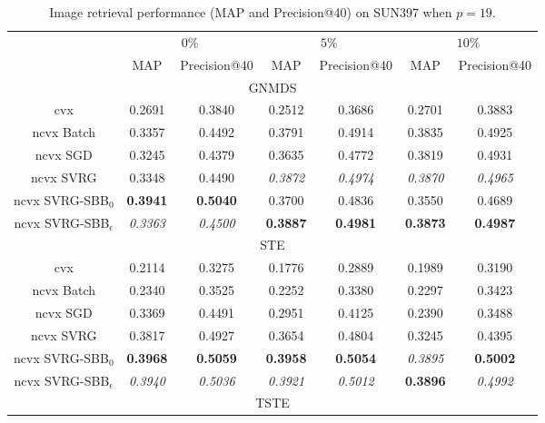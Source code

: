 \documentclass[letterpaper]{article} %
\begin{document}
{
	\begin{table}[tbh]
		\centering
		\caption{Image retrieval performance (MAP and Precision@40) on SUN397 when $p=19$.}
		{
			\begin{tabular}{c||cc||cc||cc}
				\hline
				& \multicolumn{2}{c||}{$0\%$} & \multicolumn{2}{c||}{$5\%$} & \multicolumn{2}{c}{$10\%$}\\
				&  MAP& Precision@40 & MAP 	& Precision@40 & MAP & Precision@40 \\ \hline\hline
				\multicolumn{7}{c}{GNMDS} \\\hline\hline
				cvx              & 0.2691  & 0.3840  & 0.2512  & 0.3686   & 0.2701  & 0.3883  \\ \hline
				ncvx Batch    & 0.3357  & 0.4492  & 0.3791  & 0.4914   & 0.3835  & 0.4925  \\ \hline
				ncvx SGD      & 0.3245  & 0.4379  & 0.3635  & 0.4772   & 0.3819  & 0.4931  \\ \hline
				ncvx SVRG     & 0.3348  & 0.4490  & \textit{0.3872}  & \textit{0.4974}   & \textit{0.3870}  & \textit{0.4965}  \\ \hline
				ncvx SVRG-SBB$_0$  & \textbf{0.3941}  & \textbf{0.5040}  & 0.3700  & 0.4836   & 0.3550  & 0.4689  \\ \hline
				ncvx SVRG-SBB$_\epsilon$ & \textit{0.3363}  & \textit{0.4500}  & \textbf{0.3887}  & \textbf{0.4981}   & \textbf{0.3873}  & \textbf{0.4987} \\
				\hline\hline
				\multicolumn{7}{c}{STE} \\\hline\hline
				cvx              & 0.2114  & 0.3275  & 0.1776 & 0.2889 & 0.1989 & 0.3190  \\ \hline
				ncvx Batch    & 0.2340  & 0.3525  & 0.2252 & 0.3380 & 0.2297 & 0.3423  \\ \hline
				ncvx SGD      & 0.3369  & 0.4491  & 0.2951 & 0.4125 & 0.2390 & 0.3488  \\ \hline
				ncvx SVRG     & 0.3817  & 0.4927  & 0.3654 & 0.4804 & 0.3245 & 0.4395  \\ \hline
				ncvx SVRG-SBB$_0$  & \textbf{0.3968}   & \textbf{0.5059} & \textbf{0.3958} & \textbf{0.5054} & \textit{0.3895} & \textbf{0.5002}  \\ \hline
				ncvx SVRG-SBB$_\epsilon$ & \textit{0.3940}  & \textit{0.5036}  & \textit{0.3921} & \textit{0.5012} & \textbf{0.3896} & \textit{0.4992}  \\
				\hline\hline
				\multicolumn{7}{c}{TSTE} \\\hline\hline

\end{tabular}}
\end{table}}
\end{document}
